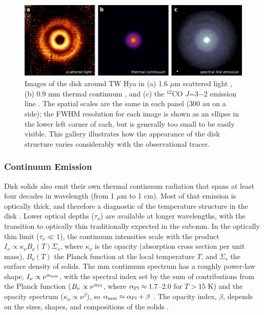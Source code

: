 \documentclass[a4paper]{ar-1col}
\begin{document}
\begin{figure}[t]
\includegraphics[width=\textwidth]{twhya_gallery.pdf}
\caption{Images of the disk around TW Hya in (a) 1.6 $\mu$m scattered light \citep{vanboekel17}, (b) 0.9 mm thermal continuum \citep{andrews16}, and (c) the $^{12}$CO $J$=3$-$2 emission line \citep{huang18}.  The spatial scales are the same in each panel (300 au on a side); the FWHM resolution for each image is shown as an ellipse in the lower left corner of each, but is generally too small to be easily visible.  This gallery illustrates how the appearance of the disk structure varies considerably with the observational tracer.}
\label{fig:ims}
\end{figure}


\subsubsection{Continuum Emission} \label{sec:primer_cont}
Disk solids also emit their own thermal continuum radiation that spans at least four decades in wavelength (from 1 $\mu$m to 1 cm).  Most of that emission is optically thick, and therefore a diagnostic of the temperature structure in the disk \citep[e.g., see][]{andrews15}.  Lower optical depths ($\tau_\nu$) are available at longer wavelengths, with the transition to optically thin traditionally expected in the sub-mm.  In the optically thin limit ($\tau_\nu \ll 1$), the continuum intensities scale with the product $I_\nu \propto \kappa_\nu B_\nu(T) \Sigma_s$, where $\kappa_\nu$ is the opacity (absorption cross section per unit mass), $B_\nu(T)$ the Planck function at the local temperature $T$, and $\Sigma_s$ the surface density of solids.  The mm continuum spectrum has a roughly power-law shape, $I_\nu \propto \nu^{\alpha_{\rm mm}}$, with the spectral index set by the sum of contributions from the Planck function ($B_\nu \propto \nu^{\alpha_{\rm Pl}}$, where $\alpha_{\rm Pl} \approx 1.7$--2.0 for $T > 15$ K) and the opacity spectrum ($\kappa_\nu \propto \nu^\beta$), so $\alpha_{\rm mm} \approx \alpha_{\rm Pl} + \beta$ \citep{beckwith91,ricci10a,ricci10b}.  The opacity index, $\beta$, depends on the sizes, shapes, and compositions of the solids \citep{miyake93,dalessio01,draine06}.  
\end{document}
